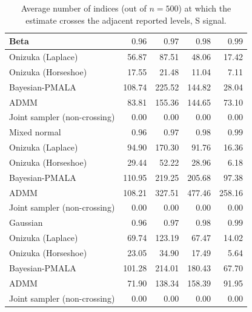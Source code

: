 \begin{table}[!htbp]
\centering
\small
\caption{Average number of indices (out of $n=500$) at which the estimate crosses the adjacent reported levels, S signal.}
\label{tab:ext_s_crossings_neighbor}
\begin{tabular}{lrrrr}
\toprule
Beta & $0.96$ & $0.97$ & $0.98$ & $0.99$ \\
\midrule
Onizuka (Laplace) & 56.87 & 87.51 & 48.06 & 17.42 \\
Onizuka (Horseshoe) & 17.55 & 21.48 & 11.04 & 7.11 \\
Bayesian-PMALA & 108.74 & 225.52 & 144.82 & 28.04 \\
ADMM & 83.81 & 155.36 & 144.65 & 73.10 \\
Joint sampler (non-crossing) & 0.00 & 0.00 & 0.00 & 0.00 \\
\midrule
Mixed normal & $0.96$ & $0.97$ & $0.98$ & $0.99$ \\
\midrule
Onizuka (Laplace) & 94.90 & 170.30 & 91.76 & 16.36 \\
Onizuka (Horseshoe) & 29.44 & 52.22 & 28.96 & 6.18 \\
Bayesian-PMALA & 110.95 & 219.25 & 205.68 & 97.38 \\
ADMM & 108.21 & 327.51 & 477.46 & 258.16 \\
Joint sampler (non-crossing) & 0.00 & 0.00 & 0.00 & 0.00 \\
\midrule
Gaussian & $0.96$ & $0.97$ & $0.98$ & $0.99$ \\
\midrule
Onizuka (Laplace) & 69.74 & 123.19 & 67.47 & 14.02 \\
Onizuka (Horseshoe) & 23.05 & 34.90 & 17.49 & 5.64 \\
Bayesian-PMALA & 101.28 & 214.01 & 180.43 & 67.70 \\
ADMM & 71.90 & 138.34 & 158.39 & 91.95 \\
Joint sampler (non-crossing) & 0.00 & 0.00 & 0.00 & 0.00 \\
\bottomrule
\end{tabular}
\end{table}
